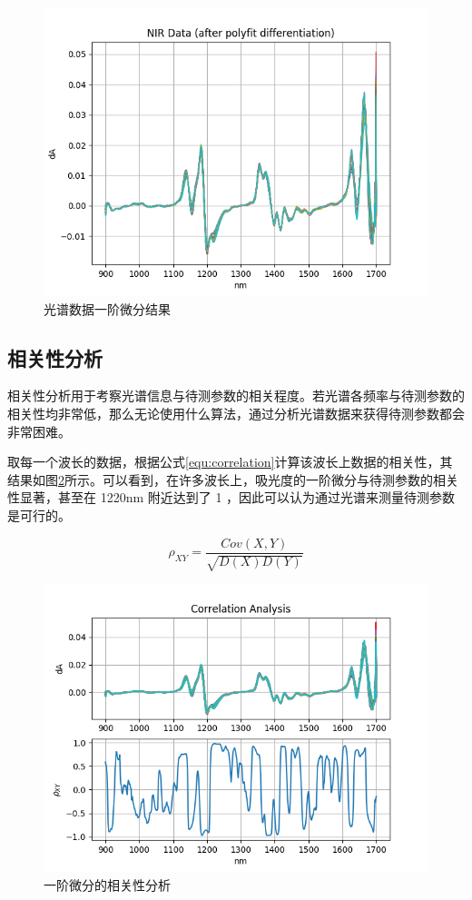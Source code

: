 \documentclass[a4paper]{article}
\begin{document}
			\begin{figure}
				\centering
				\includegraphics[width=\linewidth]{../img/diff}
				\caption{光谱数据一阶微分结果}
				\label{fig:diff}
			\end{figure}
			
		\subsection{相关性分析}
			相关性分析用于考察光谱信息与待测参数的相关程度。若光谱各频率与待测参数的相关性均非常低，那么无论使用什么算法，通过分析光谱数据来获得待测参数都会非常困难。
			
			取每一个波长的数据，根据公式\eqref{equ:correlation}计算该波长上数据的相关性，其结果如图\ref{fig:correlation}所示。可以看到，在许多波长上，吸光度的一阶微分与待测参数的相关性显著，甚至在 1220nm 附近达到了 1 ，因此可以认为通过光谱来测量待测参数是可行的。
			
			\begin{equation}\label{equ:correlation}
				\rho_{XY} = \frac{Cov(X, Y)}{\sqrt{D(X)D(Y)}}
			\end{equation}
			\begin{figure}
				\centering
				\includegraphics[width=\linewidth]{../img/correlation}
				\caption{一阶微分的相关性分析}
				\label{fig:correlation}
			\end{figure}
			
\end{document}
